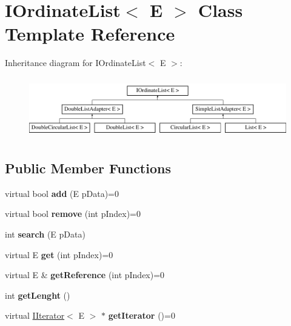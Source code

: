 \hypertarget{class_i_ordinate_list}{\section{I\-Ordinate\-List$<$ E $>$ Class Template Reference}
\label{class_i_ordinate_list}
}
Inheritance diagram for I\-Ordinate\-List$<$ E $>$\-:\begin{figure}[H]
\begin{center}
\leavevmode
\includegraphics[height=2.675159cm]{class_i_ordinate_list}
\end{center}
\end{figure}
\subsection*{Public Member Functions}
\begin{DoxyCompactItemize}
\item 
\hypertarget{class_i_ordinate_list_af158c9cda23201b2a17e857ffcdf4cdd}{virtual bool {\bfseries add} (E p\-Data)=0}\label{class_i_ordinate_list_af158c9cda23201b2a17e857ffcdf4cdd}

\item 
\hypertarget{class_i_ordinate_list_a1015be27579a09c4805505ea3e4c4752}{virtual bool {\bfseries remove} (int p\-Index)=0}\label{class_i_ordinate_list_a1015be27579a09c4805505ea3e4c4752}

\item 
\hypertarget{class_i_ordinate_list_a596e09a9f1854ca3a570a42bd23dc816}{int {\bfseries search} (E p\-Data)}\label{class_i_ordinate_list_a596e09a9f1854ca3a570a42bd23dc816}

\item 
\hypertarget{class_i_ordinate_list_aef65b00ca705d1b106d51bff512b2021}{virtual E {\bfseries get} (int p\-Index)=0}\label{class_i_ordinate_list_aef65b00ca705d1b106d51bff512b2021}

\item 
\hypertarget{class_i_ordinate_list_a126adb3087d227a7bd47288002c6d48e}{virtual E \& {\bfseries get\-Reference} (int p\-Index)=0}\label{class_i_ordinate_list_a126adb3087d227a7bd47288002c6d48e}

\item 
\hypertarget{class_i_ordinate_list_acc0d473f2b9b464cc82b5e6cdb887b2a}{int {\bfseries get\-Lenght} ()}\label{class_i_ordinate_list_acc0d473f2b9b464cc82b5e6cdb887b2a}

\item 
\hypertarget{class_i_ordinate_list_aa555ab647394d5bf06bb4f38715bd167}{virtual \hyperlink{class_i_iterator}{I\-Iterator}$<$ E $>$ $\ast$ {\bfseries get\-Iterator} ()=0}\label{class_i_ordinate_list_aa555ab647394d5bf06bb4f38715bd167}

\end{DoxyCompactItemize}
